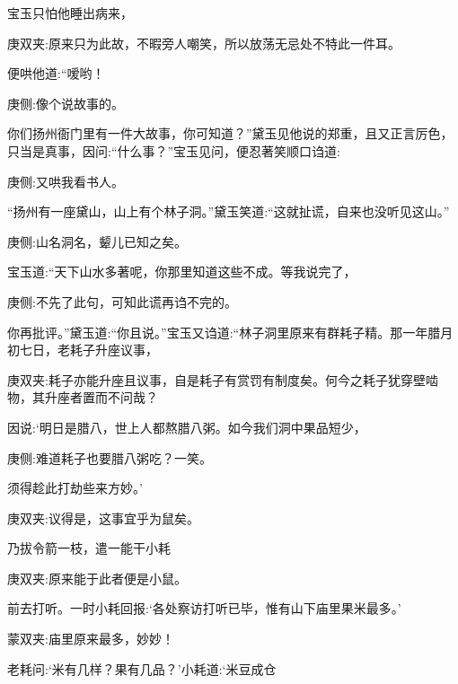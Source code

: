\begin{parag}
    宝玉只怕他睡出病来，\begin{note}庚双夹:原来只为此故，不暇旁人嘲笑，所以放荡无忌处不特此一件耳。\end{note}便哄他道:“嗳哟！\begin{note}庚侧:像个说故事的。\end{note}你们扬州衙门里有一件大故事，你可知道？”黛玉见他说的郑重，且又正言厉色，只当是真事，因问:“什么事？”宝玉见问，便忍著笑顺口诌道:\begin{note}庚侧:又哄我看书人。\end{note}“扬州有一座黛山，山上有个林子洞。”黛玉笑道:“这就扯谎，自来也没听见这山。”\begin{note}庚侧:山名洞名，颦儿已知之矣。\end{note}宝玉道:“天下山水多著呢，你那里知道这些不成。等我说完了，\begin{note}庚侧:不先了此句，可知此谎再诌不完的。\end{note}你再批评。”黛玉道:“你且说。”宝玉又诌道:“林子洞里原来有群耗子精。那一年腊月初七日，老耗子升座议事，\begin{note}庚双夹:耗子亦能升座且议事，自是耗子有赏罚有制度矣。何今之耗子犹穿壁啮物，其升座者置而不问哉？\end{note}因说:‘明日是腊八，世上人都熬腊八粥。如今我们洞中果品短少，\begin{note}庚侧:难道耗子也要腊八粥吃？一笑。\end{note}须得趁此打劫些来方妙。’\begin{note}庚双夹:议得是，这事宜乎为鼠矣。\end{note}乃拔令箭一枝，遣一能干小耗\begin{note}庚双夹:原来能于此者便是小鼠。\end{note}前去打听。一时小耗回报:‘各处察访打听已毕，惟有山下庙里果米最多。’\begin{note}蒙双夹:庙里原来最多，妙妙！\end{note}老耗问:‘米有几样？果有几品？’小耗道:‘米豆成仓
\end{parag}

